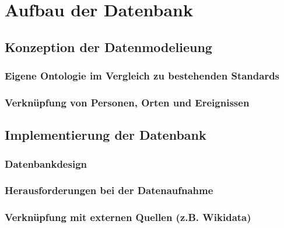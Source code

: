 \documentclass[12pt, a4paper, ngerman, bidi=default]{article}
\begin{document}
\newpage

     \section{Aufbau der Datenbank}
    \subsection{Konzeption der Datenmodelieung}
      \subsubsection{Eigene Ontologie im Vergleich zu bestehenden Standards}
      \subsubsection{Verknüpfung von Personen, Orten und Ereignissen}
    
    \subsection{Implementierung der Datenbank}
      \subsubsection{Datenbankdesign}
      \subsubsection{Herausforderungen bei der Datenaufnahme}
      \subsubsection{Verknüpfung mit externen Quellen (z.B. Wikidata)}

    \newpage
\end{document}
